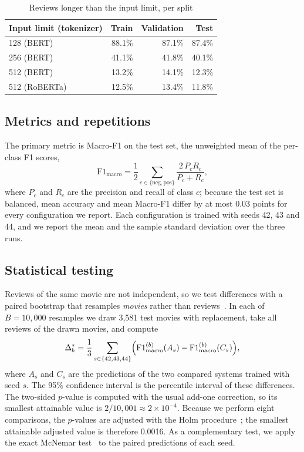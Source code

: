\documentclass[conference]{IEEEtran}
\begin{document}
\begin{table}[t]
\caption{Reviews longer than the input limit, per split}
\label{tab:trunc}
\centering
\footnotesize
\setlength{\tabcolsep}{4pt}
\begin{tabular}{lrrr}
\toprule
Input limit (tokenizer) & Train & Validation & Test \\
\midrule
128 (BERT) & 88.1\% & 87.1\% & 87.4\% \\
256 (BERT) & 41.1\% & 41.8\% & 40.1\% \\
512 (BERT) & 13.2\% & 14.1\% & 12.3\% \\
512 (RoBERTa) & 12.5\% & 13.4\% & 11.8\% \\
\bottomrule
\end{tabular}
\end{table}

\subsection{Metrics and repetitions}
The primary metric is Macro-F1 on the test set, the unweighted mean of the per-class F1 scores,
\begin{equation}
\mathrm{F1}_{\mathrm{macro}} = \frac{1}{2}\sum_{c\in\{\mathrm{neg},\mathrm{pos}\}} \frac{2\,P_c R_c}{P_c + R_c},
\end{equation}
where $P_c$ and $R_c$ are the precision and recall of class $c$; because the test set is balanced, mean accuracy and mean Macro-F1 differ by at most 0.03 points for every configuration we report. Each configuration is trained with seeds 42, 43 and 44, and we report the mean and the sample standard deviation over the three runs.

\subsection{Statistical testing}
Reviews of the same movie are not independent, so we test differences with a paired bootstrap that resamples \emph{movies} rather than reviews~\cite{efron1993}. In each of $B=10{,}000$ resamples we draw 3{,}581 test movies with replacement, take all reviews of the drawn movies, and compute
\begin{equation}
\Delta^{*}_{b} = \frac{1}{3}\sum_{s\in\{42,43,44\}} \Bigl(\mathrm{F1}_{\mathrm{macro}}^{(b)}(A_s) - \mathrm{F1}_{\mathrm{macro}}^{(b)}(C_s)\Bigr),
\end{equation}
where $A_s$ and $C_s$ are the predictions of the two compared systems trained with seed $s$. The 95\% confidence interval is the percentile interval of these differences. The two-sided $p$-value is computed with the usual add-one correction, so its smallest attainable value is $2/10{,}001 \approx 2\times10^{-4}$. Because we perform eight comparisons, the $p$-values are adjusted with the Holm procedure~\cite{holm1979}; the smallest attainable adjusted value is therefore 0.0016. As a complementary test, we apply the exact McNemar test~\cite{mcnemar1947,dietterich1998} to the paired predictions of each seed.
\end{document}
